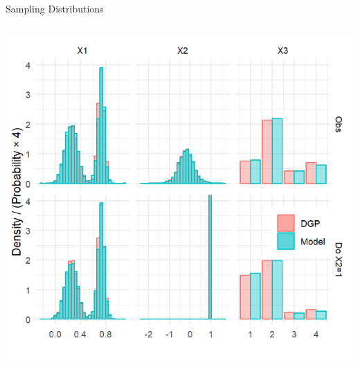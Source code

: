 \documentclass[onlytextwidth,english]{beamer}\usepackage[]{graphicx}\usepackage[]{xcolor}
\begin{document}
\begin{frame}{Sampling Distributions}


\begin{columns}

\begin{column}{0.75\linewidth}
    \includegraphics[width=1\linewidth]{img/Sampling_Distributions.png}
  \end{column}
  

\end{columns}
\end{frame}
\end{document}
